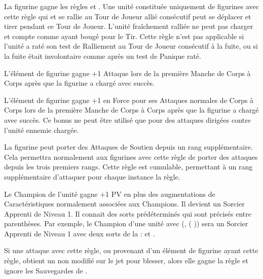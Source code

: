 
La figurine gagne les règles \vanguard{} et \newfromWHB{\lighttroops}. Une unité constituée uniquement de figurines avec cette règle qui  et se rallie au Tour de Joueur allié consécutif peut se déplacer et tirer pendant ce Tour de Joueur. L'unité fraîchement ralliée ne peut pas charger et compte comme ayant bougé pour le Tir. Cette règle n'est pas applicable si l'unité a raté son test de Ralliement au Tour de Joueur consécutif à la fuite, ou si la fuite était involontaire comme après un test de Panique raté.


L'élément de figurine gagne +1 Attaque lors de la première Manche de Corps à Corps après que la figurine a chargé avec succès.


L'élément de figurine gagne +1 en Force pour ses Attaques normales de Corps à Corps lors de la première Manche de Corps à Corps après que la figurine a chargé avec succès. Ce bonus ne peut être utilisé que pour des attaques dirigées contre l'unité ennemie chargée.


La figurine peut porter des Attaques de Soutien depuis un rang supplémentaire. Cela permettra normalement aux figurines avec cette règle de porter des attaques depuis les trois premiers rangs. Cette règle est cumulable, permettant à un rang supplémentaire d'attaquer pour chaque instance la règle.


Le Champion de l'unité gagne +1 PV en plus des augmentations de Caractéristiques normalement associées aux Champions. Il devient un Sorcier Apprenti de Niveau 1. Il connait des sorts prédéterminés qui sont précisés entre parenthèses. Par exemple, le Champion d'une unité avec \og \wizardconclave{} (\changesignature{}, \changespellone{} (\Pathof{} \change{})) \fg{} sera un Sorcier Apprenti de Niveau 1 avec deux sorts de la \Pathof{} \change{} : \changesignature{} et \changespellone{}.


Si une attaque avec cette règle, ou provenant d'un élément de figurine ayant cette règle, obtient un  non modifié sur le jet pour blesser, alors elle gagne la règle  et ignore les Sauvegardes de \regeneration{}.

